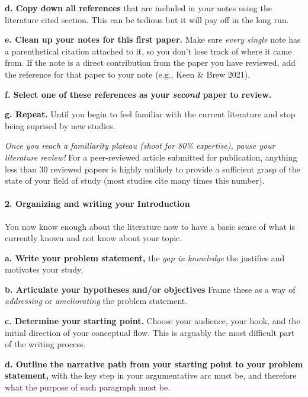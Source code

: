 \documentclass[]{book}
\let\oldparagraph\paragraph
\renewcommand{\paragraph}[1]{\oldparagraph{#1}\mbox{}}
\begin{document}
\textbf{d. Copy down all references} that are included in your notes using the literature cited section. This can be tedious but it will pay off in the long run.

\textbf{e. Clean up your notes for this first paper.} Make sure \emph{every single} note has a parenthetical citation attached to it, so you don't lose track of where it came from. If the note is a direct contribution from the paper you have reviewed, add the reference for that paper to your note (e.g., Keen \& Brew 2021).

\textbf{f. Select one of these references as your \emph{second} paper to review.}

\textbf{g. Repeat.} Until you begin to feel familiar with the current literature and stop being suprised by new studies.

\emph{Once you reach a familiarity plateau (shoot for 80\% expertise), pause your literature review!} For a peer-reviewed article submitted for publication, anything less than 30 reviewed papers is highly unlikely to provide a sufficient grasp of the state of your field of study (most studies cite many times this number).

\hypertarget{organizing-and-writing-your-introduction}{%
\paragraph{2. Organizing and writing your Introduction}\label{organizing-and-writing-your-introduction}}

You now know enough about the literature now to have a basic sense of what is currently known and not know about your topic.

\textbf{a. Write your problem statement,} the \emph{gap in knowledge} the justifies and motivates your study.

\textbf{b. Articulate your hypotheses and/or objectives} Frame these as a way of \emph{addressing} or \emph{ameliorating} the problem statement.

\textbf{c. Determine your starting point.} Choose your audience, your hook, and the initial direction of your conceptual flow. This is arguably the most difficult part of the writing process.

\textbf{d. Outline the narrative path from your starting point to your problem statement,} with the key step in your argumentative arc must be, and therefore what the purpose of each paragraph must be.
\end{document}
